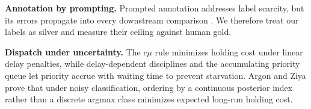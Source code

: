 \textbf{Annotation by prompting.}
Prompted annotation addresses label scarcity, but its errors propagate into
every downstream comparison \cite{northcutt2021labelerrors}. We therefore treat
our labels as silver and measure their ceiling against human gold.

\textbf{Dispatch under uncertainty.}
The $c\mu$ rule \cite{cox1961queues} minimizes holding cost under linear delay
penalties, while delay-dependent disciplines \cite{kleinrock1964delay} and the
accumulating priority queue \cite{stanford2014accumulating} let priority accrue
with waiting time to prevent starvation. Argon and Ziya
\cite{argon2009priority} prove that under noisy classification, ordering by a
continuous posterior index rather than a discrete argmax class minimizes
expected long-run holding cost.
